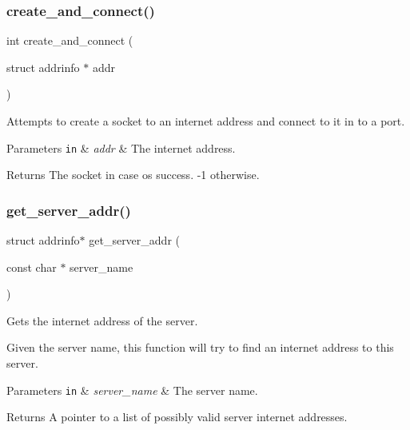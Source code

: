 \subsubsection{\texorpdfstring{create\+\_\+and\+\_\+connect()}{create\_and\_connect()}}
{\footnotesize\ttfamily int create\+\_\+and\+\_\+connect (\begin{DoxyParamCaption}\item[{struct addrinfo $\ast$}]{addr }\end{DoxyParamCaption})}



Attempts to create a socket to an internet address and connect to it in to a port. 


\begin{DoxyParams}[1]{Parameters}
\mbox{\tt in}  & {\em addr} & The internet address.\\
\hline
\end{DoxyParams}
\begin{DoxyReturn}{Returns}
The socket in case os success. {\ttfamily -\/1} otherwise. 
\end{DoxyReturn}
\mbox{\label{zip-zop-client_8c_a76840de4643d86b9d0a968ec2d1acae3}} 
\subsubsection{\texorpdfstring{get\+\_\+server\+\_\+addr()}{get\_server\_addr()}}
{\footnotesize\ttfamily struct addrinfo$\ast$ get\+\_\+server\+\_\+addr (\begin{DoxyParamCaption}\item[{const char $\ast$}]{server\+\_\+name }\end{DoxyParamCaption})}



Gets the internet address of the server. 

Given the server name, this function will try to find an internet address to this server.


\begin{DoxyParams}[1]{Parameters}
\mbox{\tt in}  & {\em server\+\_\+name} & The server name.\\
\hline
\end{DoxyParams}
\begin{DoxyReturn}{Returns}
A pointer to a list of possibly valid server internet addresses. 
\end{DoxyReturn}
\mbox{\label{zip-zop-client_8c_aed34485ec5832caf3b952362921111b4}} 
